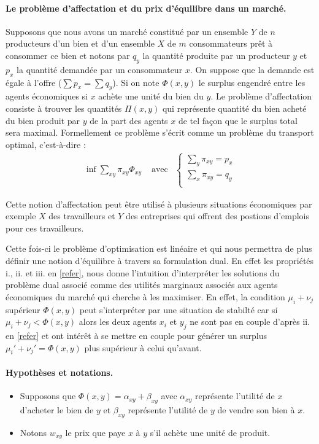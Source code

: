 \documentclass[
    8.2pt,
    a4paper,
    logo,
    twocolumn
]{template}
\begin{document}
    \paragraph{Le problème d’affectation et du prix d’équilibre dans un marché.}

    Supposons que nous avons un marché constitué par un ensemble $Y$ de $n$ producteurs d’un bien et d’un ensemble $X$ de $m$ consommateurs prêt à consommer ce bien et notons par $q_y$ la quantité produite par un producteur $y$ et $p_x$ la quantité demandée par un consommateur $x$. On suppose que la demande est égale à l’offre ($ \sum p_x = \sum q_y$). Si on note $\Phi(x,y)$ le surplus engendré entre les agents économiques si $x$ achète une unité du bien du $y$. Le problème d’affectation consiste à trouver les quantités $\Pi(x,y)$ qui représente quantité du bien acheté du bien produit par $y$ de la part des agents $x$ de tel façon que le surplus total sera maximal. Formellement ce problème s’écrit comme un problème du transport optimal, c'est-à-dire :
    \begin{align*}\label{eq:P}
        &\inf_{} \sum_{xy} \pi_{xy} \Phi_{xy} &
        \text{ avec} & \begin{cases}
            \sum_{y} \pi_{xy} = p_x \\
            \sum_{x} \pi_{xy} = q_y \\
        \end{cases} &
    \end{align*}

    Cette notion d’affectation peut être utilisé à plusieurs situations économiques par exemple $X$ des travailleurs et $Y$ des entreprises qui offrent des postions d’emplois pour ces travailleurs.

    Cette fois-ci le problème d’optimisation est linéaire et qui nous permettra de plus définir une notion d’équilibre à travers sa formulation dual. En effet les propriétés i., ii. et iii. en \ref{refer}, nous donne l’intuition d’interpréter les solutions du problème dual associé comme des utilités marginaux associés aux agents économiques du marché qui cherche à les maximiser. En effet, la condition $\mu_i+\nu_j$ supérieur $\Phi(x,y)$ peut s’interpréter par une situation de stabilté car si $\mu_i + \nu_j <  \Phi(x,y)$ alors  les deux agents $x_i$ et $y_j$ ne sont pas en couple d’après ii. en \ref{refer} et ont intérêt à se mettre en couple pour générer un surplus $\mu_i' + \nu_j' = \Phi(x,y)$ plus supérieur à celui qu’avant.

    \paragraph{Hypothèses et notations.}
    \begin{itemize}

        \item Supposons que $\Phi(x,y)=\alpha_{xy} + \beta_{xy}$ avec $\alpha_{xy}$  représente l’utilité de $x$ d’acheter le bien de $y$ et $\beta_{xy}$ représente l’utilité de $y$ de vendre son bien à $x$.

        \item Notons $w_{xy}$ le prix que paye $x$ à $y$ s’il achète une unité de produit.
    \end{itemize}
\end{document}
